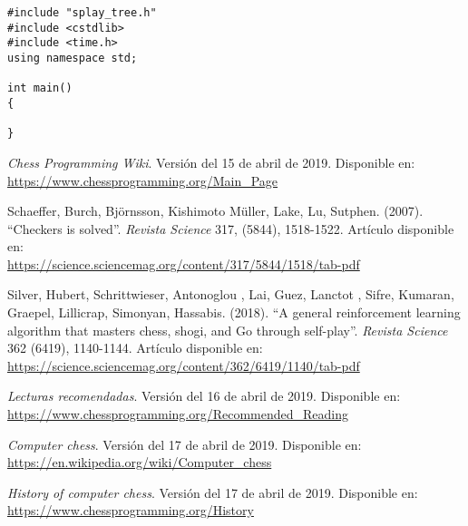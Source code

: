 \documentclass[letterpaper,12pt]{article}
\begin{document}
\begin{lstlisting}
#include "splay_tree.h"
#include <cstdlib>
#include <time.h>
using namespace std;

int main()
{

}
\end{lstlisting}



\begin{thebibliography}{99}

\textit{Chess Programming Wiki}. Versión del 15 de abril de 2019. Disponible en: \\
\url{https://www.chessprogramming.org/Main_Page}

Schaeffer, Burch, Björnsson, Kishimoto Müller, Lake, Lu, Sutphen. (2007). ``Checkers is 
solved''. \textit{Revista Science} 317, (5844), 1518-1522. Artículo disponible en: \\
\url{https://science.sciencemag.org/content/317/5844/1518/tab-pdf}

Silver, Hubert, Schrittwieser, Antonoglou , Lai, Guez, Lanctot , Sifre, Kumaran, 
Graepel, Lillicrap, Simonyan, Hassabis. (2018). ``A general reinforcement learning 
algorithm that masters chess, shogi, and Go through self-play''. \textit{Revista 
Science} 362 (6419), 1140-1144. Artículo disponible en: \\
\url{https://science.sciencemag.org/content/362/6419/1140/tab-pdf}

\textit{Lecturas recomendadas}. Versión del 16 de abril de 2019. Disponible en: \\
\url{https://www.chessprogramming.org/Recommended_Reading}

\textit{Computer chess}. Versión del 17 de abril de 2019. Disponible en: \\
\url{https://en.wikipedia.org/wiki/Computer_chess}

\textit{History of computer chess}. Versión del 17 de abril de 2019. Disponible en: \\
\url{https://www.chessprogramming.org/History}


\end{thebibliography}
\end{document}
